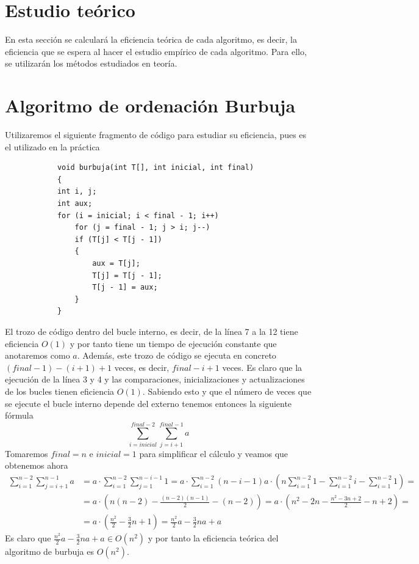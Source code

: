 \documentclass[11pt,openany]{book}
\begin{document}
    \section{Estudio teórico}
        En esta sección se calculará la eficiencia teórica de cada algoritmo, es decir, la eficiencia que se espera al hacer el
        estudio empírico de cada algoritmo. Para ello, se utilizarán los métodos estudiados en teoría.
        \section*{Algoritmo de ordenación Burbuja}
        Utilizaremos el siguiente fragmento de código para estudiar su eficiencia, pues es el utilizado en la práctica
        \begin{lstlisting}
            void burbuja(int T[], int inicial, int final)
            {
            int i, j;
            int aux;
            for (i = inicial; i < final - 1; i++)
                for (j = final - 1; j > i; j--)
                if (T[j] < T[j - 1])
                {
                    aux = T[j];
                    T[j] = T[j - 1];
                    T[j - 1] = aux;
                }
            }
        \end{lstlisting}
        El trozo de código dentro del bucle interno, es decir, de la línea 7 a la 12 tiene eficiencia $O(1)$ y por tanto
        tiene un tiempo de ejecución constante que anotaremos como $a$. Además, este trozo de código se ejecuta
        en concreto $(final-1)-(i+1) +1$ veces, es decir, $final-i+1$ veces. Es claro que la ejecución de la línea 3 y 4 
        y las comparaciones, inicializaciones y actualizaciones de los bucles tienen eficiencia $O(1)$. Sabiendo esto y que 
        el número de veces que se ejecute el bucle interno depende del externo tenemos entonces la siguiente fórmula 
        \begin{equation*}
            \sum_{i=inicial}^{final-2} \sum_{j=i+1}^{final-1}a 
        \end{equation*}
        Tomaremos $final =  n$ e $inicial = 1$ para simplificar el cálculo y veamos que obtenemos ahora
        \begin{equation*}\begin{split}
            \sum_{i=1}^{n-2} \sum_{j=i+1}^{n-1}a&= a \cdot \sum_{i=1}^{n-2} \sum_{j=1}^{n-i-1}1
             = a \cdot \sum_{i=1}^{n-2} (n-i-1) a \cdot ( n\sum_{i=1}^{n-2} 1 - \sum_{i=1}^{n-2} i - \sum_{i=1}^{n-2} 1)= \\
            &= a \cdot ( n(n-2) - \frac{(n-2)(n-1)}{2} - (n-2))= a \cdot ( n^2-2n - \frac{n^2-3n+2}{2} - n+2)=\\
            &= a \cdot \left(\frac{n^2}{2}-\frac{3}{2}n+1\right)= \frac{n^2}{2}a-\frac{3}{2}na+a
        \end{split}\end{equation*}
        Es claro que $\frac{n^2}{2}a-\frac{3}{2}na+a \in O(n^2)$ y por tanto la eficiencia teórica del algoritmo de burbuja es $O(n^2)$.
\end{document}
